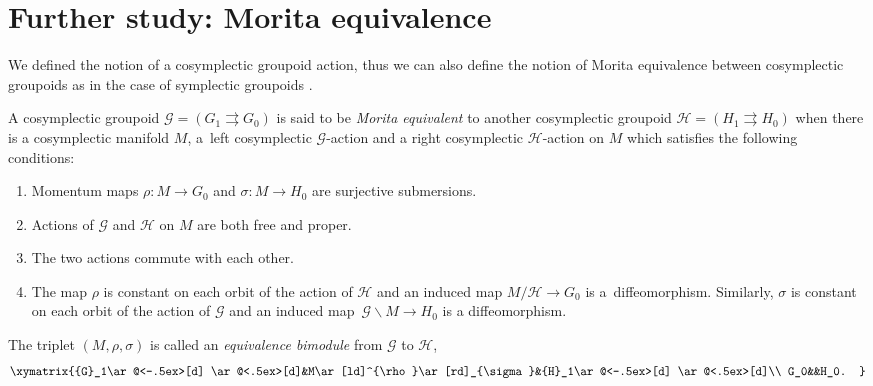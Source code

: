 \documentclass[10pt,a4paper]{amsart}
\numberwithin{equation}{section}
\begin{document}
\section{Further study: Morita equivalence}\label{morita}

We defined the notion of a cosymplectic groupoid action, thus we can also define the notion of Morita equivalence between cosymplectic groupoids as in the case of symplectic groupoids \cite{xu2}.

\begin{Definition}
 A cosymplectic groupoid $\mathcal{G}=({G}_1\rightrightarrows G_0)$ is said to be \textit{Morita equivalent} to another cosymplectic groupoid $\mathcal{H}=({H}_1\rightrightarrows H_0)$ when there is a cosymplectic manifold $M$, a~left cosymplectic $\mathcal{G}$-action and a right cosymplectic $\mathcal{H}$-action on $M$ which satisfies the following conditions:
 \begin{enumerate}\itemsep=0pt
 \item[(1)] Momentum maps $\rho\colon M\to G_0$ and $\sigma\colon M\to H_0$ are surjective submersions.

 \item[(2)] Actions of $\mathcal{G}$ and $\mathcal{H}$ on $M$ are both free and proper.

 \item[(3)] The two actions commute with each other.

 \item[(4)] The map $\rho$ is constant on each orbit of the action of $\mathcal{H}$ and an induced map $M/\mathcal{H}\to G_0$ is a~diffeomorphism. Similarly, $\sigma$ is constant on each orbit of the action of $\mathcal{G}$ and an induced map~${\mathcal{G}\backslash M\to H_0}$ is a diffeomorphism.
 \end{enumerate}
 The triplet $(M,\rho,\sigma)$ is called an \textit{equivalence bimodule} from $\mathcal{G}$ to $\mathcal{H}$,
 \[\xymatrix{{G}_1\ar@<-.5ex>[d] \ar@<.5ex>[d]&M\ar[ld]^{\rho}\ar[rd]_{\sigma}&{H}_1\ar@<-.5ex>[d] \ar@<.5ex>[d]\\
 G_0&&H_0.
 }\]
\end{Definition}
\end{document}

